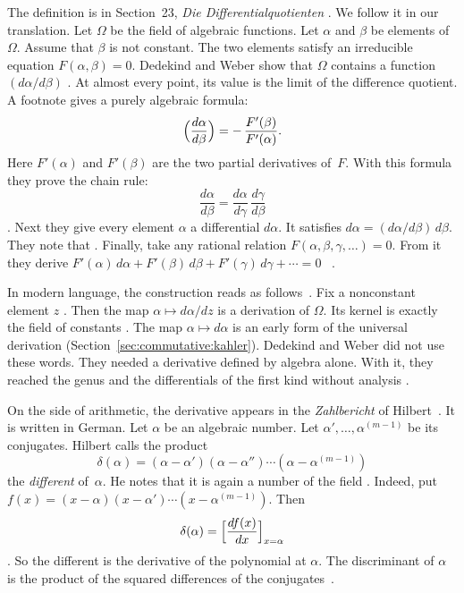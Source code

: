 The definition is in Section~23, \emph{Die Differentialquotienten}
\cite[\S 23, p.~259]{DedekindWeber1882}. We follow it in our translation. Let $\Omega$ be the field of algebraic
functions. Let $\alpha$ and $\beta$ be elements of $\Omega$. Assume that
$\beta$ is not constant. The two elements satisfy an irreducible equation
$F(\alpha,\beta) = 0$. Dedekind and Weber show that $\Omega$ contains a
function $(d\alpha/d\beta)$ \cite[\S 23, p.~259]{DedekindWeber1882}. At
almost every point, its value is the limit of the difference quotient. A footnote gives a purely algebraic formula:
\[
  \Bigl(\frac{d\alpha}{d\beta}\Bigr) = -\,\frac{F'(\beta)}{F'(\alpha)}.
\]
Here $F'(\alpha)$ and $F'(\beta)$ are the two partial derivatives of~$F$.
With this formula they prove the chain rule:
\[
  \frac{d\alpha}{d\beta} = \frac{d\alpha}{d\gamma}\,\frac{d\gamma}{d\beta}
\]
\cite[\S 23, pp.~259--260]{DedekindWeber1882}. Next they give every element
$\alpha$ a differential $d\alpha$. It satisfies $d\alpha =
(d\alpha/d\beta)\, d\beta$. They note that . Finally, take any
rational relation $F(\alpha,\beta,\gamma,\ldots) = 0$. From it they derive
$F'(\alpha)\,d\alpha + F'(\beta)\,d\beta + F'(\gamma)\,d\gamma + \cdots = 0$%
~\cite[\S 23, p.~261]{DedekindWeber1882}.

In modern language, the construction reads as follows~\cite[p.~183]{DedekindWeber1882}. Fix a nonconstant
element $z$ \cite[\S 23, p.~259]{DedekindWeber1882}. Then the map $\alpha
\mapsto d\alpha/dz$ is a derivation of $\Omega$. Its kernel is exactly the
field of constants \cite[\S 23, p.~259]{DedekindWeber1882}. The map $\alpha
\mapsto d\alpha$ is an early form of the universal derivation
(Section~\ref{sec:commutative:kahler}). Dedekind and Weber did not use these
words. They needed a derivative defined by algebra alone. With it, they
reached the genus and the differentials of the first kind without analysis
\cite[p.~183]{DedekindWeber1882}.

On the side of arithmetic, the derivative appears in the \emph{Zahlbericht} of Hilbert~\cite{Hilbert1897}. It is written in German.
Let $\alpha$ be an algebraic number. Let $\alpha', \ldots, \alpha^{(m-1)}$ be
its conjugates. Hilbert calls the product
\[
  \delta(\alpha) = (\alpha-\alpha')(\alpha-\alpha'')\cdots(\alpha-\alpha^{(m-1)})
\]
the \emph{different} of~$\alpha$. He notes that it is again a number of the
field \cite[\S 3, p.~179]{Hilbert1897}. Indeed, put $f(x) = (x-\alpha)(x-\alpha')\cdots(x-\alpha^{(m-1)})$.
Then
\[
  \delta(\alpha) = \Bigl[\frac{df(x)}{dx}\Bigr]_{x=\alpha}
\]
\cite[\S 3, p.~179]{Hilbert1897}. So the different is the derivative of the
polynomial at $\alpha$. The discriminant of $\alpha$ is the product of the
squared differences of the conjugates~\cite[\S 3, p.~179]{Hilbert1897}.

